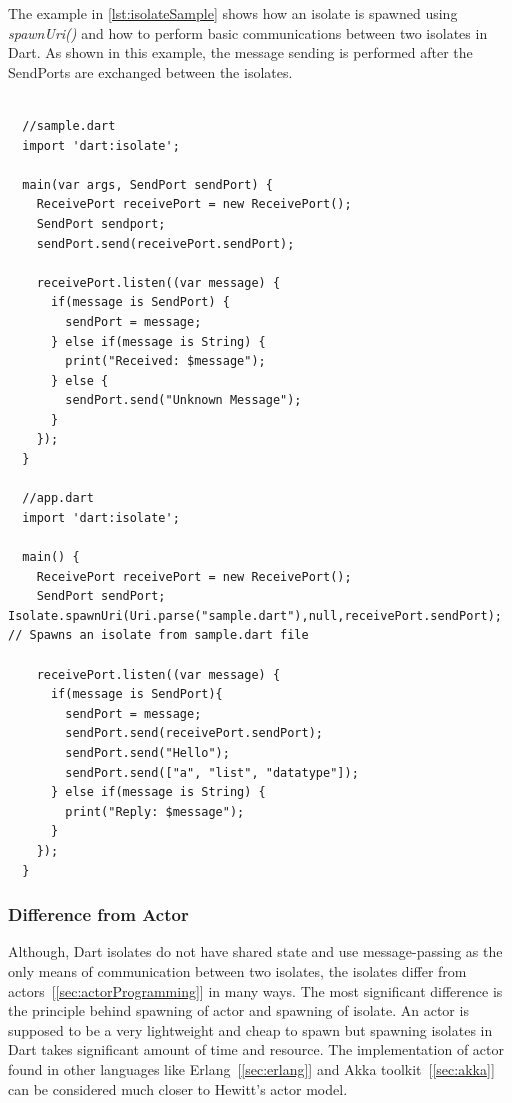  The example in \autoref{lst:isolateSample} shows how an isolate is spawned using \emph{spawnUri()} and how to perform basic communications between two isolates in Dart. As shown in this example, the message sending is performed after the SendPorts are exchanged between the isolates.

\begin{lstlisting}[caption=A simple example of isolate communication in dart, label=lst:isolateSample]

  //sample.dart
  import 'dart:isolate';

  main(var args, SendPort sendPort) {
    ReceivePort receivePort = new ReceivePort();
    SendPort sendport;
    sendPort.send(receivePort.sendPort);

    receivePort.listen((var message) {
      if(message is SendPort) {
        sendPort = message;
      } else if(message is String) {
        print("Received: $message");
      } else {
        sendPort.send("Unknown Message");
      }
    });
  }

  //app.dart
  import 'dart:isolate';

  main() {
    ReceivePort receivePort = new ReceivePort();
    SendPort sendPort;  Isolate.spawnUri(Uri.parse("sample.dart"),null,receivePort.sendPort); // Spawns an isolate from sample.dart file

    receivePort.listen((var message) {
      if(message is SendPort){
        sendPort = message;
        sendPort.send(receivePort.sendPort);
        sendPort.send("Hello");
        sendPort.send(["a", "list", "datatype"]);
      } else if(message is String) {
        print("Reply: $message");
      }
    });
  }
\end{lstlisting}

  \subsubsection{Difference from Actor}
  Although, Dart isolates do not have shared state and use message-passing as the only means of communication between two isolates, the isolates differ from actors~[\autoref{sec:actorProgramming}] in many ways. The most significant difference is the principle behind spawning of actor and spawning of isolate. An actor is supposed to be a very lightweight and cheap to spawn but spawning isolates in Dart takes significant amount of time and resource. The implementation of actor found in other languages like Erlang~[\autoref{sec:erlang}] and Akka toolkit~[\autoref{sec:akka}] can be considered much closer to Hewitt's actor model.

